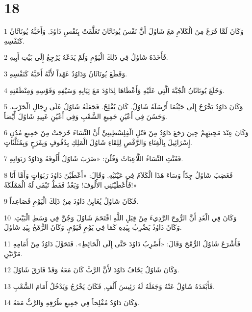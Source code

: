 \chapter{18}

\par 1 وَكَانَ لَمَّا فَرَغَ مِنَ الْكَلاَمِ مَعَ شَاوُلَ أَنَّ نَفْسَ يُونَاثَانَ تَعَلَّقَتْ بِنَفْسِ دَاوُدَ, وَأَحَبَّهُ يُونَاثَانُ كَنَفْسِهِ.
\par 2 فَأَخَذَهُ شَاوُلُ فِي ذَلِكَ الْيَوْمِ وَلَمْ يَدَعْهُ يَرْجِعُ إِلَى بَيْتِ أَبِيهِ.
\par 3 وَقَطَعَ يُونَاثَانُ وَدَاوُدُ عَهْداً لأَنَّهُ أَحَبَّهُ كَنَفْسِهِ.
\par 4 وَخَلَعَ يُونَاثَانُ الْجُبَّةَ الَّتِي عَلَيْهِ وَأَعْطَاهَا لِدَاوُدَ مَعَ ثِيَابِهِ وَسَيْفِهِ وَقَوْسِهِ وَمِنْطَقَتِهِ.
\par 5 وَكَانَ دَاوُدُ يَخْرُجُ إِلَى حَيْثُمَا أَرْسَلَهُ شَاوُلُ. كَانَ يُفْلِحُ. فَجَعَلَهُ شَاوُلُ عَلَى رِجَالِ الْحَرْبِ. وَحَسُنَ فِي أَعْيُنِ جَمِيعِ الشَّعْبِ وَفِي أَعْيُنِ عَبِيدِ شَاوُلَ أَيْضاً.
\par 6 وَكَانَ عِنْدَ مَجِيئِهِمْ حِينَ رَجَعَ دَاوُدُ مِنْ قَتْلِ الْفِلِسْطِينِيِّ أَنَّ النِّسَاءَ خَرَجَتْ مِنْ جَمِيعِ مُدُنِ إِسْرَائِيلَ بِالْغِنَاءِ وَالرَّقْصِ لِلِقَاءِ شَاوُلَ الْمَلِكِ بِدُفُوفٍ وَبِفَرَحٍ وَبِمُثَلَّثَاتٍ.
\par 7 فَغَنَّتِ النِّسَاءُ اللَّاعِبَاتُ وَقُلْنَ: «ضَرَبَ شَاوُلُ أُلُوفَهُ وَدَاوُدُ رَبَوَاتِهِ.
\par 8 فَغَضِبَ شَاوُلُ جِدّاً وَسَاءَ هَذَا الْكَلاَمُ فِي عَيْنَيْهِ, وَقَالَ: «أَعْطَيْنَ دَاوُدَ رَبَوَاتٍ وَأَمَّا أَنَا فَأَعْطَيْنَنِي الأُلُوفَ! وَبَعْدُ فَقَطْ تَبْقَى لَهُ الْمَمْلَكَةُ!»
\par 9 فَكَانَ شَاوُلُ يُعَايِنُ دَاوُدَ مِنْ ذَلِكَ الْيَوْمِ فَصَاعِداً.
\par 10 وَكَانَ فِي الْغَدِ أَنَّ الرُّوحَ الرَّدِيءَ مِنْ قِبَلِ اللَّهِ اقْتَحَمَ شَاوُلَ وَجُنَّ فِي وَسَطِ الْبَيْتِ. وَكَانَ دَاوُدُ يَضْرِبُ بِيَدِهِ كَمَا فِي يَوْمٍ فَيَوْمٍ, وَكَانَ الرُّمْحُ بِيَدِ شَاوُلَ.
\par 11 فَأَشْرَعَ شَاوُلُ الرُّمْحَ وَقَالَ: «أَضْرِبُ دَاوُدَ حَتَّى إِلَى الْحَائِطِ». فَتَحَوَّلَ دَاوُدُ مِنْ أَمَامِهِ مَرَّتَيْنِ.
\par 12 وَكَانَ شَاوُلُ يَخَافُ دَاوُدَ لأَنَّ الرَّبَّ كَانَ مَعَهُ وَقَدْ فَارَقَ شَاوُلَ.
\par 13 فَأَبْعَدَهُ شَاوُلُ عَنْهُ وَجَعَلَهُ لَهُ رَئِيسَ أَلْفٍ, فَكَانَ يَخْرُجُ وَيَدْخُلُ أَمَامَ الشَّعْبِ.
\par 14 وَكَانَ دَاوُدُ مُفْلِحاً فِي جَمِيعِ طُرُقِهِ وَالرَّبُّ مَعَهُ.
